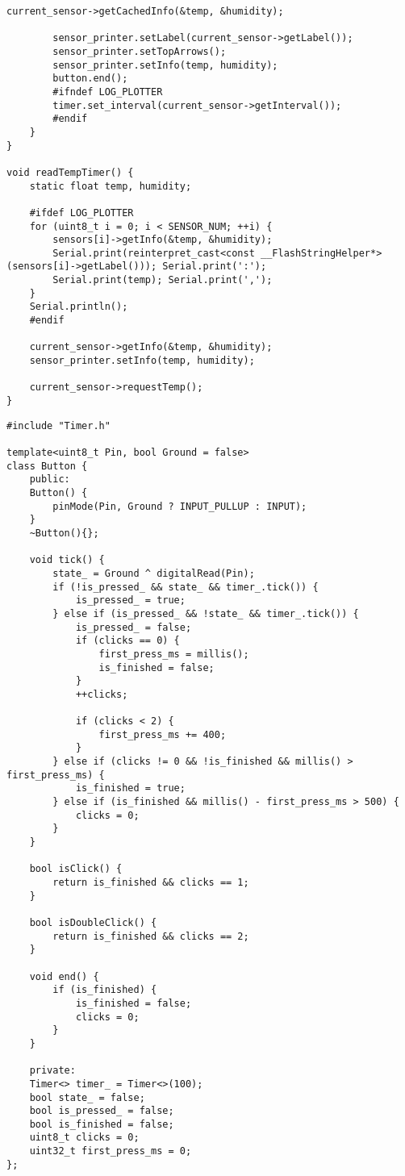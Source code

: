 \begin{lstlisting}[style=cpp-small, caption=Код основної частини програми, label=lst:program]
        current_sensor->getCachedInfo(&temp, &humidity);

        sensor_printer.setLabel(current_sensor->getLabel());
        sensor_printer.setTopArrows();
        sensor_printer.setInfo(temp, humidity);
        button.end();
        #ifndef LOG_PLOTTER
        timer.set_interval(current_sensor->getInterval());
        #endif
    }
}

void readTempTimer() {
    static float temp, humidity;

    #ifdef LOG_PLOTTER
    for (uint8_t i = 0; i < SENSOR_NUM; ++i) {
        sensors[i]->getInfo(&temp, &humidity);
        Serial.print(reinterpret_cast<const __FlashStringHelper*>(sensors[i]->getLabel())); Serial.print(':'); 
        Serial.print(temp); Serial.print(',');
    }
    Serial.println();
    #endif

    current_sensor->getInfo(&temp, &humidity);
    sensor_printer.setInfo(temp, humidity);

    current_sensor->requestTemp();
}
\end{lstlisting}

\begin{lstlisting}[style=cpp-small, caption=Клас для роботи з кнопкою, label=lst:button]
#include "Timer.h"

template<uint8_t Pin, bool Ground = false>
class Button {
    public:
    Button() {
        pinMode(Pin, Ground ? INPUT_PULLUP : INPUT);
    }
    ~Button(){};

    void tick() {
        state_ = Ground ^ digitalRead(Pin);
        if (!is_pressed_ && state_ && timer_.tick()) {
            is_pressed_ = true;
        } else if (is_pressed_ && !state_ && timer_.tick()) {
            is_pressed_ = false;
            if (clicks == 0) {
                first_press_ms = millis();
                is_finished = false;
            }
            ++clicks;
            
            if (clicks < 2) {
                first_press_ms += 400;
            }
        } else if (clicks != 0 && !is_finished && millis() > first_press_ms) {
            is_finished = true;
        } else if (is_finished && millis() - first_press_ms > 500) {
            clicks = 0;
        }
    }

    bool isClick() {
        return is_finished && clicks == 1;
    }

    bool isDoubleClick() {
        return is_finished && clicks == 2;
    }

    void end() {
        if (is_finished) {
            is_finished = false;
            clicks = 0;
        }
    }

    private:
    Timer<> timer_ = Timer<>(100);
    bool state_ = false;
    bool is_pressed_ = false;
    bool is_finished = false;
    uint8_t clicks = 0;
    uint32_t first_press_ms = 0;
};
\end{lstlisting}

